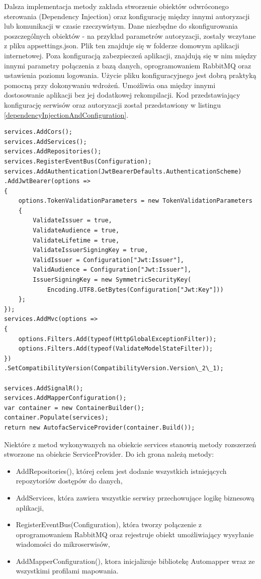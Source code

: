Dalsza implementacja metody zakłada stworzenie obiektów odwróconego sterowania (Dependency Injection) oraz konfigurację między innymi autoryzacji lub komunikacji w czasie rzeczywistym. Dane niezbędne do skonfigurowania poszczególnych obiektów - na przykład parametrów autoryzacji, zostały wczytane z pliku appsettings.json. Plik ten znajduje się w folderze domowym aplikacji internetowej. Poza konfiguracją zabezpieczeń aplikacji, znajdują się w nim między innymi parametry połączenia z bazą danych, oprogramowaniem RabbitMQ oraz ustawienia poziomu logowania. Użycie pliku konfiguracyjnego jest dobrą praktyką pomocną przy dokonywaniu wdrożeń. Umożliwia ona między innymi dostosowanie aplikacji bez jej dodatkowej rekompilacji. Kod przedstawiający konfigurację serwisów oraz autoryzacji został przedstawiony w listingu \ref{dependencyInjectionAndConfiguration}. 

\begin{lstlisting}[caption={Stworzenie obiektów odwróconego sterowania.},label={dependencyInjectionAndConfiguration} ]
services.AddCors();
services.AddServices();
services.AddRepositories();
services.RegisterEventBus(Configuration);
services.AddAuthentication(JwtBearerDefaults.AuthenticationScheme)
.AddJwtBearer(options =>
{
	options.TokenValidationParameters = new TokenValidationParameters
	{
		ValidateIssuer = true,
		ValidateAudience = true,
		ValidateLifetime = true,
		ValidateIssuerSigningKey = true,
		ValidIssuer = Configuration["Jwt:Issuer"],
		ValidAudience = Configuration["Jwt:Issuer"],
		IssuerSigningKey = new SymmetricSecurityKey(
			Encoding.UTF8.GetBytes(Configuration["Jwt:Key"]))
	};
});
services.AddMvc(options =>
{
	options.Filters.Add(typeof(HttpGlobalExceptionFilter));
	options.Filters.Add(typeof(ValidateModelStateFilter));
})
.SetCompatibilityVersion(CompatibilityVersion.Version\_2\_1);

services.AddSignalR();
services.AddMapperConfiguration();
var container = new ContainerBuilder();
container.Populate(services);
return new AutofacServiceProvider(container.Build());
\end{lstlisting}

Niektóre z metod wykonywanych na obiekcie services stanowią metody rozszerzeń stworzone na obiekcie ServiceProvider. Do ich grona należą metody:
\begin{itemize}[noitemsep]
	\item AddRepositories(), której celem jest dodanie wszystkich istniejących repozytoriów dostępów do danych,
	\item AddServices, która zawiera wszystkie serwisy przechowujące logikę biznesową aplikacji,
	\item RegisterEventBus(Configuration), która tworzy połączenie z oprogramowaniem RabbitMQ oraz rejestruje obiekt umożliwiający wysyłanie wiadomości do mikroserwisów,
	\item AddMapperConfiguration(), ktora inicjalizuje bibliotekę Automapper wraz ze wszystkimi profilami mapowania.
\end{itemize}


